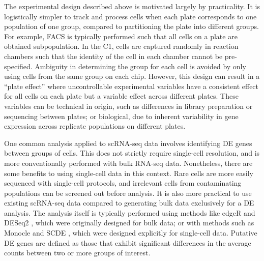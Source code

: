 \documentclass[oupdraft]{bio}
\begin{document}
The experimental design described above is motivated largely by practicality.
It is logistically simpler to track and process cells when each plate corresponds to one population of one group, compared to partitioning the plate into different groups.
For example, FACS is typically performed such that all cells on a plate are obtained  subpopulation.
In the C1, cells are captured randomly in reaction chambers such that the identity of the cell in each chamber cannot be pre-specified.
Ambiguity in determining the group for each cell is avoided by only using cells from the same group on each chip.
However, this design can result in a ``plate effect'' where uncontrollable experimental variables have a consistent effect  for all cells on each plate but a variable effect across different plates. 
These variables can be technical in origin, such as differences in library preparation or sequencing between plates; 
    or biological, due to inherent variability in gene expression across replicate populations on different plates.


One common analysis applied to scRNA-seq data involves identifying DE genes between groups of cells.
This does not strictly require single-cell resolution, and is more conventionally performed with bulk RNA-seq data.
Nonetheless, there are some benefits to using single-cell data in this context.
Rare cells are more easily sequenced with single-cell protocols, and irrelevant cells from contaminating populations can be screened out before analysis.
It is also more practical to use existing scRNA-seq data compared to generating bulk data exclusively for a DE analysis.
The analysis itself is typically performed using methods like edgeR \citep{robinson2010edgeR} and DESeq2 \citep{love2014moderated}, which were originally designed for bulk data;
    or with methods such as Monocle \citep{trapnell2014dynamics} and SCDE \citep{kharchenko2014bayesian}, which were designed explicitly for single-cell data.
Putative DE genes are defined as those that exhibit significant differences in the average counts between two or more groups of interest.
\end{document}
